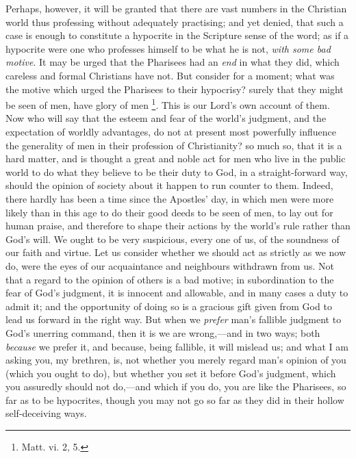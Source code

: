 Perhaps, however, it will be granted that there are
vast numbers in the Christian world thus professing
without adequately practising; and yet denied, that such
a case is enough to constitute a hypocrite in the
Scripture sense of the word; as if a hypocrite were one
who professes himself to be what he is not, \emph{with some
bad motive}. It may be urged that the Pharisees had an
\emph{end} in what they did, which careless and formal
Christians have not. But consider for a moment; what was
the motive which urged the Pharisees to their hypocrisy?
surely that they might be seen of men, have glory of men \footnote{Matt. vi. 2, 5.}. This is our Lord's own account of
them. Now who will say that the esteem and fear of the
world's judgment, and the expectation of worldly
advantages, do not at present most powerfully influence
the generality of men in their profession of
Christianity? so much so, that it is a hard matter, and
is thought a great and noble act for men who live in the
public world to do what they believe to be their duty to
God, in a straight-forward way, should the opinion of
society about it happen to run counter to them. Indeed,
there hardly has been a time since the Apostles' day, in
which men were more likely than in this age to do their
good deeds to be seen of men, to lay out for human
praise, and therefore to shape their actions by the
world's rule rather than God's will. We ought to be very
suspicious, every one of us, of the soundness of our
faith and virtue. Let us consider whether we should act
as strictly as we now do, were the eyes of our
acquaintance and neighbours withdrawn from us. Not that a
regard to the opinion of others is a bad motive; in
subordination to the fear of God's judgment, it is
innocent and allowable, and in many cases a duty to admit
it; and the opportunity of doing so is a gracious gift
given from God to lead us forward in the right way. But
when we \emph{prefer} man's fallible judgment to God's
unerring command, then it is we are wrong,—and in
two ways; both \emph{because} we prefer it, and because,
being fallible, it will mislead us; and what I am asking
you, my brethren, is, not whether you merely regard man's
opinion of you (which you ought to do), but whether you
set it before God's judgment, which you assuredly should
not do,—and which if you do, you are like the
Pharisees, so far as to be hypocrites, though you may not
go so far as they did in their hollow self-deceiving
ways.

